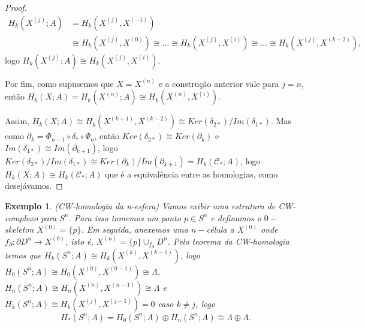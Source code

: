\documentclass[12pt]{book}
\newtheorem{exemplo}[teorema]{Exemplo}
\newcommand{\celula}[2]{D^{#1}_{#2}}
\newcommand{\celulabordo}[2]{\partial D^{#1}_{#2}}
\newcommand{\homologia}[2]{H_{#1}(#2;A)}
\newcommand{\homologiarel}[3]{H_{#1}(#2,#3)}
\newcommand{\homologiarelskele}[3]{H_{#1}(X^{(#2)}, X^{(#3)})}
\newcommand{\homologiarelskelesimpl}[2]{H_{#1}(X^{(#2)}, X^{(#2-1)})}
\newcommand{\skeleton}[1]{X^{(#1)}}
\begin{document}
\begin{proof}
		$$
		\begin{aligned}
		\homologia{k}{\skeleton{j}} &= \homologiarel{k}{\skeleton{j}}{\skeleton{-1}} 
		\\
		&\cong  \homologiarel{k}{\skeleton{j}}{\skeleton{0}} \cong \dots \cong  \homologiarel{k}{\skeleton{j}}{\skeleton{i}} \cong  \dots \cong \homologiarel{k}{\skeleton{j}}{\skeleton{k-2}},
		\end{aligned}
		$$
		logo $\homologia{k}{\skeleton{j}} \cong \homologiarel{k}{\skeleton{j}}{\skeleton{i}}$.
		
		Por fim, como supusemos que $X = \skeleton{n}$ e a construção anterior vale para $j = n$, então $\homologia{k}{X} = \homologia{k}{\skeleton{n}} \cong \homologiarelskele{k}{n}{i}$.
		
		Assim, $\homologia{k}{X} \cong \homologiarel{k}{\skeleton{k+1}}{\skeleton{k-2}} \cong Ker(\delta_{2*})/Im(\delta_{1*})$. Mas como $\partial_{k} = \Phi_{n-1}\circ\delta_{*}\circ\Psi_{n}$, então $Ker(\delta_{2*}) \cong Ker(\partial_{k})$ e $Im(\delta_{1*}) \cong Im(\partial_{k+1})$, logo $Ker(\delta_{2*})/Im(\delta_{1*}) \cong Ker(\partial_{k})/Im(\partial_{k+1}) = \homologia{k}{\mathcal{C}_{*}}$, logo $\homologia{k}{X} \cong \homologia{k}{\mathcal{C}_{*}}$ que é a equivalência entre as homologias, como desejávamos.
	\end{proof}
	
	\begin{exemplo}
		(CW-homologia da n-esfera)
		Vamos exibir uma estrutura de CW-complexo para $S^{n}$. Para isso tomemos um ponto $p \in S^{n}$ e definamos o $0-$skeleton $\skeleton{0}=\{p\}$. Em seguida, anexemos uma $n-$célula a $\skeleton{0}$ onde $f_{\partial}: \celulabordo{n}{} \to \skeleton{0}$, isto é, $\skeleton{n} = \{p\}\cup_{f_{\partial}} \celula{n}{}$. Pelo teorema da CW-homologia temos que $\homologia{k}{S^{n}} \cong \homologiarelskelesimpl{k}{k}$, logo $\homologia{0}{S^{n}} \cong \homologiarelskelesimpl{0}{0} \cong \Lambda$, $\homologia{n}{S^{n}} \cong \homologiarelskelesimpl{n}{n} \cong \Lambda$ e $\homologia{k}{S^{n}} \cong \homologiarelskelesimpl{k}{j} =0$ caso $k \neq j$, logo
		$$
		\homologia{*}{S^{n}} = \homologia{0}{S^{n}}\oplus\homologia{n}{S^{n}} \cong \Lambda\oplus\Lambda.
		$$
	\end{exemplo}
	
\end{document}
